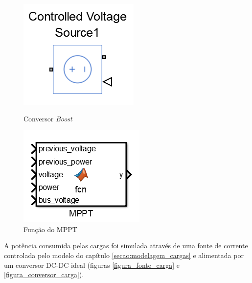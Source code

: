 \begin{figure}[!htpb]
\begin{minipage}{0.5\textwidth}
\begin{center}
\includegraphics[scale=0.5]{figures/boostConverterBlock.png}
\end{center}
\caption{Conversor \textit{Boost}}
\label{figura_conversor_boost_simulacao}
\end{minipage}
\begin{minipage}{0.5\textwidth}
\begin{center}
\includegraphics[scale=0.5]{figures/MPPT_block.png}
\end{center}
\caption{Função do MPPT}
\label{figura_bloco_mppt}
\end{minipage}
\end{figure}

A potência consumida pelas cargas foi simulada através de uma fonte de corrente controlada pelo modelo do capítulo \ref{secao:modelagem_cargas} e alimentada por um conversor DC-DC ideal (figuras \ref{figura_fonte_carga} e \ref{figura_conversor_carga}).

